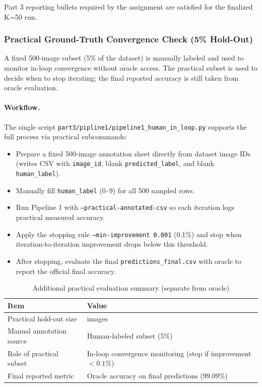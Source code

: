 Part 3 reporting bullets required by the assignment are satisfied for the finalized K=50 run.

\subsubsection{Practical Ground-Truth Convergence Check (5\% Hold-Out)}

A fixed 500-image subset (5\% of the dataset) is manually labeled and used to monitor in-loop convergence without oracle access. The practical subset is used to decide when to stop iterating; the final reported accuracy is still taken from oracle evaluation.

\paragraph{Workflow.}
The single script \texttt{part3/pipline1/pipeline1\_human\_in\_loop.py} supports the full process via practical subcommands:
\begin{itemize}
    \item Prepare a fixed 500-image annotation sheet directly from dataset image IDs (writes CSV with \texttt{image\_id}, blank \texttt{predicted\_label}, and blank \texttt{human\_label}).
    \item Manually fill \texttt{human\_label} (0--9) for all 500 sampled rows.
    \item Run Pipeline 1 with \texttt{--practical-annotated-csv} so each iteration logs practical measured accuracy.
    \item Apply the stopping rule \texttt{--min-improvement 0.001} (0.1\%) and stop when iteration-to-iteration improvement drops below this threshold.
    \item After stopping, evaluate the final \texttt{predictions\_final.csv} with oracle to report the official final accuracy.
\end{itemize}

\begin{table}[H]
\centering
\caption{Additional practical evaluation summary (separate from oracle)}
\label{tab:part3_practical_additional}
\begin{tabular}{>{\raggedright\arraybackslash}p{}>{\raggedright\arraybackslash}p{}}
\toprule
\textbf{Item} & \textbf{Value} \\
\midrule
Practical hold-out size & 500 images \\
Manual annotation source & Human-labeled subset (5\%) \\
Role of practical subset & In-loop convergence monitoring (stop if improvement $<0.1\%$) \\
Final reported metric & Oracle accuracy on final predictions (99.09\%) \\
\bottomrule
\end{tabular}
\end{table}